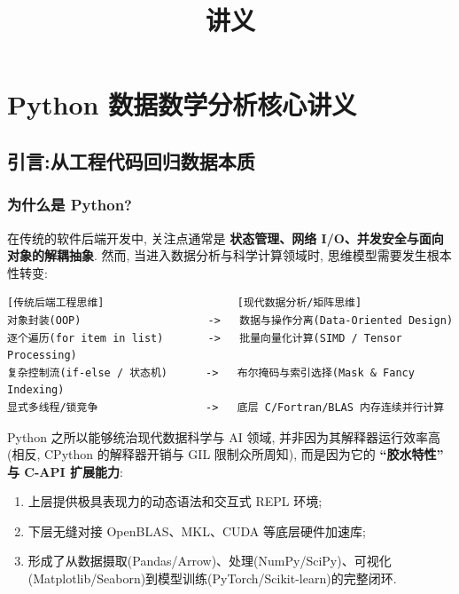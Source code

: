\documentclass[11pt]{article}
\title{讲义}
\providecommand{\tightlist}{%
      \setlength{\itemsep}{0pt}\setlength{\parskip}{0pt}}
\begin{document}
    
    \maketitle
    
    

    
    \section{Python
数据数学分析核心讲义}\label{python-ux6570ux636eux6570ux5b66ux5206ux6790ux6838ux5fc3ux8bb2ux4e49}

    \subsection{引言:从工程代码回归数据本质}\label{ux5f15ux8a00ux4eceux5de5ux7a0bux4ee3ux7801ux56deux5f52ux6570ux636eux672cux8d28}

    \subsubsection{为什么是 Python?}\label{ux4e3aux4ec0ux4e48ux662f-python}

    在传统的软件后端开发中, 关注点通常是 \textbf{状态管理、网络
I/O、并发安全与面向对象的解耦抽象}. 然而,
当进入数据分析与科学计算领域时, 思维模型需要发生根本性转变:

\begin{verbatim}
[传统后端工程思维]                     [现代数据分析/矩阵思维]
对象封装(OOP)                    ->   数据与操作分离(Data-Oriented Design)
逐个遍历(for item in list)       ->   批量向量化计算(SIMD / Tensor Processing)
复杂控制流(if-else / 状态机)      ->   布尔掩码与索引选择(Mask & Fancy Indexing)
显式多线程/锁竞争                 ->   底层 C/Fortran/BLAS 内存连续并行计算
\end{verbatim}

Python 之所以能够统治现代数据科学与 AI 领域,
并非因为其解释器运行效率高(相反, CPython 的解释器开销与 GIL
限制众所周知), 而是因为它的 \textbf{``胶水特性'' 与 C-API 扩展能力}:

\begin{enumerate}
\def\labelenumi{\arabic{enumi}.}
\tightlist
\item
  上层提供极具表现力的动态语法和交互式 REPL 环境;
\item
  下层无缝对接 OpenBLAS、MKL、CUDA 等底层硬件加速库;
\item
  形成了从数据摄取(Pandas/Arrow)、处理(NumPy/SciPy)、可视化(Matplotlib/Seaborn)到模型训练(PyTorch/Scikit-learn)的完整闭环.
\end{enumerate}
\end{document}
